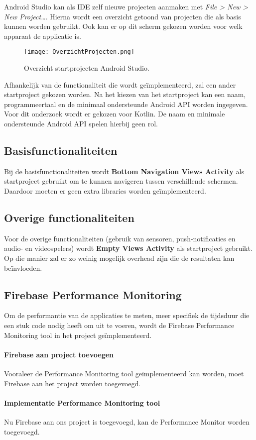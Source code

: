Android Studio kan als IDE zelf nieuwe projecten aanmaken met \textit{File > New > New Project\dots}. 
Hierna wordt een overzicht getoond van projecten die als basis kunnen worden gebruikt. Ook 
kan er op dit scherm gekozen worden voor welk apparaat de applicatie is.
\begin{figure}[H]
    \centering
    \texttt{[image: OverzichtProjecten.png]}
    \caption{Overzicht startprojecten Android Studio.}
\end{figure}
Afhankelijk van de functionaliteit die wordt geïmplementeerd, zal een ander 
startproject gekozen worden. Na het kiezen van het startproject kan een naam, 
programmeertaal en de minimaal ondersteunde Android API worden ingegeven. Voor dit onderzoek wordt er gekozen 
voor Kotlin. De naam en minimale ondersteunde Android API spelen hierbij geen rol.

\subsection{Basisfunctionaliteiten}
\label{par:basisfunctionaliteiten}
Bij de basisfunctionaliteiten wordt
\textbf{Bottom Navigation Views Activity} als startproject gebruikt om te kunnen navigeren tussen 
verschillende schermen. Daardoor moeten er geen extra libraries worden geïmplementeerd.

\subsection{Overige functionaliteiten}
Voor de overige functionaliteiten (gebruik van sensoren, 
push-notificaties en audio- en videospelers) wordt
\textbf{Empty Views Activity} als startproject gebruikt. Op die manier zal er zo weinig mogelijk 
\gls{overhead} zijn die de resultaten kan beïnvloeden.

\subsection{Firebase Performance Monitoring}
Om de performantie van de applicaties te meten, meer specifiek de tijdsduur 
die een stuk code nodig heeft om uit te voeren, 
wordt de Firebase Performance Monitoring tool in het project geïmplementeerd. 

\paragraph{Firebase aan project toevoegen}
Vooraleer de Performance Monitoring tool geïmplementeerd kan worden, moet Firebase 
aan het project worden toegevoegd.



\paragraph{Implementatie Performance Monitoring tool}
Nu Firebase aan ons project is toegevoegd, kan de Performance Monitor 
worden toegevoegd.


